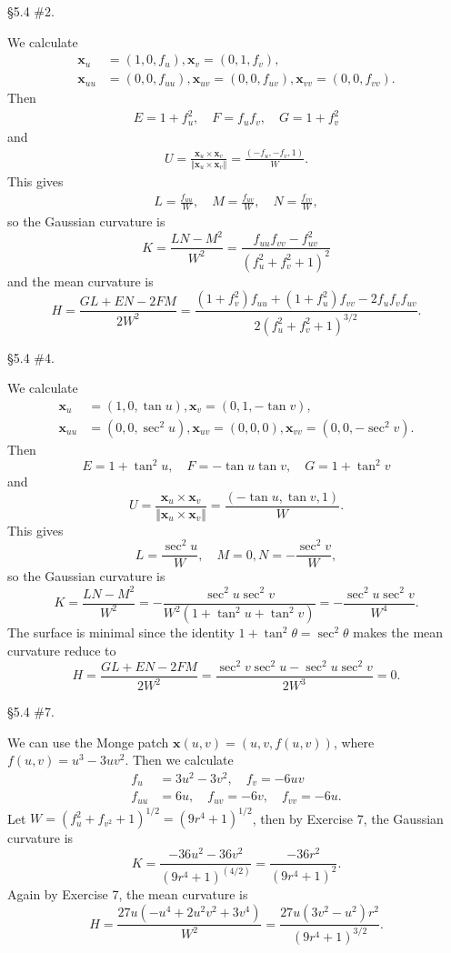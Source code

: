 \documentclass[10pt]{report}
\begin{document}
\begin{exer}[]
\S 5.4 \#2.
\end{exer}
We calculate
\begin{align*}
	\mathbf{x}_u&=(1,0,f_u), \mathbf{x}_v=(0,1,f_v),\\
	\mathbf{x}_{uu}&=(0,0,f_{uu}), \mathbf{x}_{uv}=(0,0,f_{uv}), \mathbf{x}_{vv}=(0,0,f_{vv}).
\end{align*}
Then
\begin{align*}
	E = 1+f_{u}^2, \quad F=f_uf_v, \quad G=1+f_v^2
\end{align*}
and
\begin{align*}
	U = \frac{\mathbf{x}_{u}\times \mathbf{x}_{v}}{{\Vert{\mathbf{x}_{u}\times \mathbf{x}_{v}}\Vert}} = \frac{(-f_u,-f_v,1)}{W} .
\end{align*}
This gives
\begin{align*}
	L=\frac{f_{uu}}{W} ,\quad M=\frac{f_{uv}}{W} , \quad N=\frac{f_{vv}}{W},
\end{align*}
so the Gaussian curvature is
\[
	K = \frac{LN-M^2}{W^2} = \frac{f_{uu}f_{vv}-f_{uv}^2}{(f_u^2+f_v^2+1)^2}
\] and the mean curvature is
\[
	H = \frac{GL+EN-2FM}{2W^2} = \frac{(1+f_v^2)f_{uu}+(1+f_{u}^2)f_{vv}-2f_{u}f_{v}f_{uv}}{2(f_{u}^2+f_{v}^2+1)^{3/2}} .
\] 


\begin{exer}[]
\S 5.4 \#4.
\end{exer}
We calculate
\begin{align*}
	\mathbf{x}_{u}&=(1,0,\tan u), \mathbf{x}_{v}=(0,1,-\tan v),\\
	\mathbf{x}_{uu}&=(0,0,\sec^2 u), \mathbf{x}_{uv}=(0,0,0), \mathbf{x}_{vv}=(0,0,-\sec^2 v).
\end{align*}
Then
\[
E = 1+\tan^2 u, \quad F = -\tan u \tan v, \quad G = 1+ \tan^2 v
\] and
\[
	U = \frac{\mathbf{x}_{u}\times \mathbf{x}_{v}}{{\Vert{\mathbf{x}_{u}\times \mathbf{x}_{v}}\Vert}} = \frac{(-\tan u, \tan v,1)}{W} .
\] This gives
\[
L = \frac{\sec^2 u}{W} , \quad M = 0, N = -\frac{\sec^2 v}{W} ,
\] so the Gaussian curvature is
\[
	K = \frac{LN-M^2}{W^2} = -\frac{\sec^2 u \sec^2 v}{W^2(1+\tan^2 u + \tan^2 v)} = -\frac{\sec^2 u \sec^2 v}{W^4}.
\] The surface is minimal since the identity $1 + \tan^2 \theta = \sec^2 \theta$ makes the mean curvature reduce to
\[
H = \frac{GL+EN-2FM}{2W^2} = \frac{\sec^2 v \sec^2 u - \sec^2 u \sec^2 v}{2W^3} = 0.
\] 

\begin{exer}[]
\S 5.4 \#7.
\end{exer}
We can use the Monge patch $\mathbf{x}(u,v) = (u,v,f(u,v))$, where $f(u,v) = u^3-3uv^2$. Then we calculate
\begin{align*}
	f_{u}&=3u^2-3v^2, \quad f_{v}=-6uv \\
	f_{uu}&=6u, \quad f_{uv}=-6v, \quad f_{vv}=-6u.
\end{align*}
Let $W = \left( f_{u}^2+f_{v^2}+1 \right)^{1/2}=\left( 9r^4+1 \right)^{1/2}$, then by Exercise 7, the Gaussian curvature is
\[
	K = \frac{-36u^2-36v^2}{(9r^4+1)^(4/2)} = \frac{-36r^2}{(9r^4+1)^2} .
\] Again by Exercise 7, the mean curvature is
\[
	H = \frac{27u(-u^4+2u^2v^2+3v^4)}{W^2} = \frac{27u(3v^2-u^2)r^2}{(9r^4+1)^{3/2}} .
\] 
\end{document}
